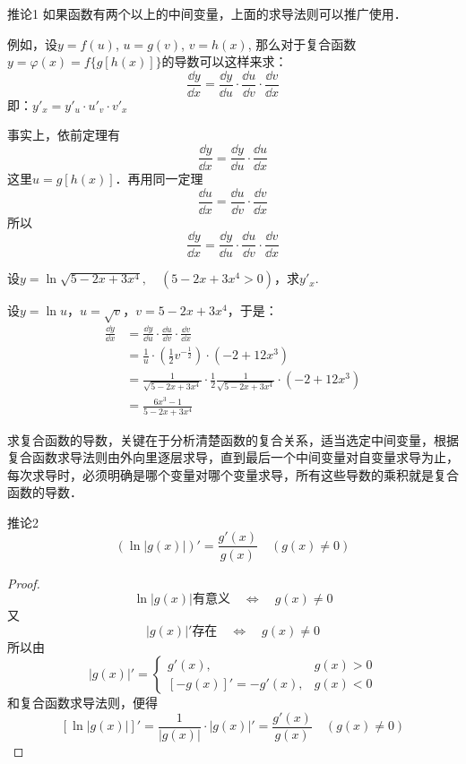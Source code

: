 \begin{blk}
{推论1} 如果函数有两个以上的中间变量，上面的求导法则可以推广使用．
\end{blk}

例如，设$y=f(u)$, $u=g(v)$, $v=h(x)$, 那么对于复合函数$y=\varphi (x)=f\{g[h(x)]\}$的导数可以这样来求：
\[\frac{\dd y}{\dd x}=\frac{\dd y}{\dd u}\cdot \frac{\dd u}{\dd v}\cdot \frac{\dd v}{\dd x}\]
即：$y'_x=y'_u\cdot u'_v\cdot v'_x$

事实上，依前定理有
\[\frac{\dd y}{\dd x}=\frac{\dd y}{\dd u}\cdot \frac{\dd u}{\dd x}\]
这里$u=g[h(x)]$．再用同一定理
\[\frac{\dd u}{\dd x}=\frac{\dd u}{\dd v}\cdot \frac{\dd v}{\dd x}\]
所以
\[\frac{\dd y}{\dd x}=\frac{\dd y}{\dd u}\cdot \frac{\dd u}{\dd v}\cdot \frac{\dd v}{\dd x}\]


\begin{example}
    设$y=\ln\sqrt{5-2x+3x^4},\quad (5-2x+3x^4>0)$，求$y'_x$.
\end{example}

    
\begin{solution}
    设$y=\ln u$，$u=\sqrt{v}$，$v=5-2x+3x^4$，于是：
\begin{align*}
    \frac{\dd y}{\dd x}&=\frac{\dd y}{\dd u}\cdot \frac{\dd u}{\dd v}\cdot \frac{\dd v}{\dd x}\\
    &=\frac{1}{u}\cdot \left(\frac{1}{2}v^{-\tfrac{1}{2}}\right)\cdot (-2+12x^3)\\
    &=\frac{1}{\sqrt{5-2x+3x^4}}\cdot \frac{1}{2}\frac{1}{\sqrt{5-2x+3x^4}}\cdot (-2+12x^3)\\
    &=\frac{6x^3-1}{5-2x+3x^4}
\end{align*}
\end{solution}

求复合函数的导数，关键在于分析清楚函数的复合关系，适当选定中间变量，根据复合函数求导法则由外向里逐层求导，直到最后一个中间变量对自变量求导为止，每次求导时，必须明确是哪个变量对哪个变量求导，所有这些导数的乘积就是复合函数的导数．

\begin{blk}{推论2}
    \[(\ln|g(x)|)'=\frac{g'(x)}{g(x)}\quad (g(x)\ne 0)\]
\end{blk}

\begin{proof}
  \[\ln|g(x)|\text{有意义}\quad \Longleftrightarrow\quad g(x)\ne 0\]  
又
\[|g(x)|'\text{存在}\quad \Longleftrightarrow\quad g(x)\ne 0\]
所以由
\[|g(x)|'=\begin{cases}
    g'(x) ,  & g(x)>0\\
    [-g(x)]'=-g'(x), & g(x)<0
\end{cases}\]
和复合函数求导法则，便得
\[[\ln|g(x)|]'=\frac{1}{|g(x)|}\cdot |g(x)|'=\frac{g'(x)}{g(x)}\quad (g(x)\ne 0)\]
\end{proof}

